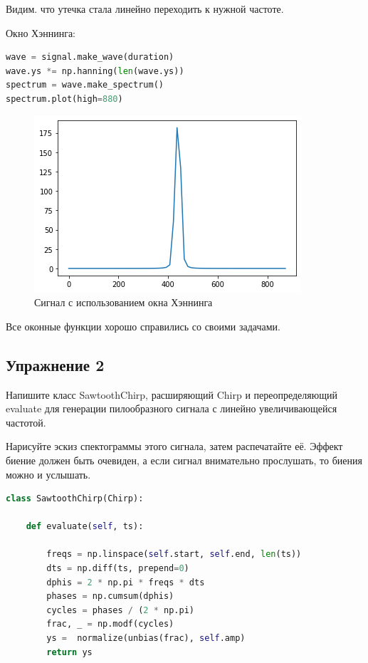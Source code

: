 Видим. что утечка стала линейно переходить к нужной частоте.

Окно Хэннинга:
\begin{lstlisting}[language=Python]
wave = signal.make_wave(duration)
wave.ys *= np.hanning(len(wave.ys))
spectrum = wave.make_spectrum()
spectrum.plot(high=880)
\end{lstlisting}
\begin{figure}[H]
	\begin{center}
		\includegraphics[scale=1]{fig/lab03/lab03_15_0.png}
		\caption{Сигнал с использованием окна Хэннинга}
	\end{center}
\end{figure}

Все оконные функции хорошо справились со своими задачами.
\subsection{Упражнение 2}


Напишите класс SawtoothChirp, расширяющий Chirp и переопределяющий evaluate для генерации пилообразного сигнала с линейно увеличивающейся частотой.

\noindent Нарисуйте эскиз спектограммы этого сигнала, затем распечатайте её. Эффект биение должен быть очевиден, а если сигнал внимательно прослушать, то биения можно и услышать.

\begin{lstlisting}[language=Python]
class SawtoothChirp(Chirp):

    def evaluate(self, ts):
        
        freqs = np.linspace(self.start, self.end, len(ts))
        dts = np.diff(ts, prepend=0)
        dphis = 2 * np.pi * freqs * dts
        phases = np.cumsum(dphis)
        cycles = phases / (2 * np.pi)
        frac, _ = np.modf(cycles)
        ys =  normalize(unbias(frac), self.amp)
        return ys
\end{lstlisting}

